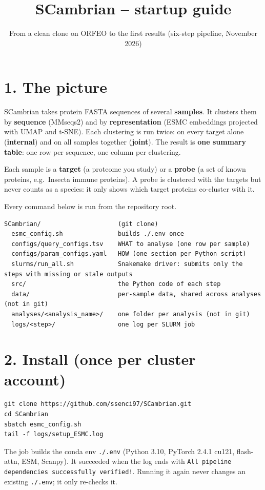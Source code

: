 \documentclass[
  10pt,
]{article}
\title{SCambrian -- startup guide}
\subtitle{From a clean clone on ORFEO to the first results (six-step
pipeline, November 2026)}
\author{}
\date{}
\begin{document}
\maketitle

\section{1. The picture}

SCambrian takes protein FASTA sequences of several \textbf{samples}. It clusters them by \textbf{sequence} (MMseqs2) and by \textbf{representation} (ESMC embeddings projected with UMAP and t-SNE). Each clustering is run twice: on every target alone (\textbf{internal}) and on all samples together (\textbf{joint}). The result is \textbf{one summary table}: one row per sequence, one column per clustering.

Each sample is a \textbf{target} (a proteome you study) or a \textbf{probe} (a set of known proteins, e.g.~Insecta immune proteins). A probe is clustered with the targets but never counts as a species: it only shows which target proteins co-cluster with it.

Every command below is run from the repository root.

\begin{verbatim}
SCambrian/                     (git clone)
  esmc_config.sh               builds ./.env once
  configs/query_configs.tsv    WHAT to analyse (one row per sample)
  configs/param_configs.yaml   HOW (one section per Python script)
  slurms/run_all.sh            Snakemake driver: submits only the steps with missing or stale outputs
  src/                         the Python code of each step
  data/                        per-sample data, shared across analyses (not in git)
  analyses/<analysis_name>/    one folder per analysis (not in git)
  logs/<step>/                 one log per SLURM job
\end{verbatim}

\section{2. Install (once per cluster account)}

\begin{verbatim}
git clone https://github.com/ssenci97/SCambrian.git
cd SCambrian
sbatch esmc_config.sh
tail -f logs/setup_ESMC.log
\end{verbatim}

The job builds the conda env \texttt{./.env} (Python 3.10, PyTorch 2.4.1 cu121, flash-attn, ESM, Scanpy). It succeeded when the log ends with \texttt{All pipeline dependencies successfully verified!}. Running it again never changes an existing \texttt{./.env}; it only re-checks it.
\end{document}
